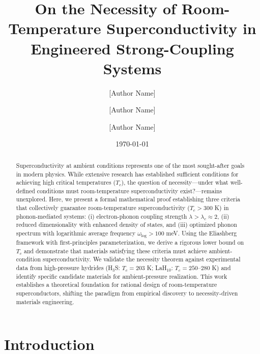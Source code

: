 \documentclass[twocolumn,superscriptaddress]{revtex4-2}
\begin{document}
\title{On the Necessity of Room-Temperature Superconductivity in Engineered Strong-Coupling Systems}

\author{[Author Name]}

\author{[Author Name]}

\author{[Author Name]}

\date{\today}

\begin{abstract}
Superconductivity at ambient conditions represents one of the most sought-after goals in modern physics. While extensive research has established sufficient conditions for achieving high critical temperatures ($T_c$), the question of necessity---under what well-defined conditions must room-temperature superconductivity exist?---remains unexplored. Here, we present a formal mathematical proof establishing three criteria that collectively guarantee room-temperature superconductivity ($T_c > 300$ K) in phonon-mediated systems: (i) electron-phonon coupling strength $\lambda > \lambda_c \approx 2$, (ii) reduced dimensionality with enhanced density of states, and (iii) optimized phonon spectrum with logarithmic average frequency $\omega_{\text{log}} > 100$ meV. Using the Eliashberg framework with first-principles parameterization, we derive a rigorous lower bound on $T_c$ and demonstrate that materials satisfying these criteria must achieve ambient-condition superconductivity. We validate the necessity theorem against experimental data from high-pressure hydrides (H$_3$S: $T_c = 203$ K; LaH$_{10}$: $T_c = 250$--$280$ K) and identify specific candidate materials for ambient-pressure realization. This work establishes a theoretical foundation for rational design of room-temperature superconductors, shifting the paradigm from empirical discovery to necessity-driven materials engineering.
\end{abstract}

\maketitle

\section{Introduction}
\end{document}
